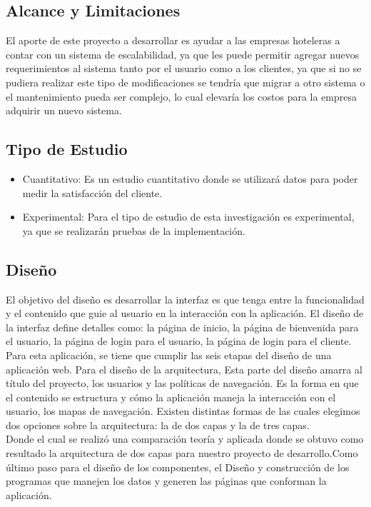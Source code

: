 \documentclass[12pt,a4paper,oneside]{article}
\begin{document}
\subsection{Alcance y Limitaciones}
El aporte de este proyecto a desarrollar es ayudar a las empresas hoteleras a contar con un sistema de escalabilidad, ya que les puede permitir agregar nuevos requerimientos al sistema tanto por el usuario como a los clientes, ya que si no se pudiera realizar este tipo de modificaciones se tendría que migrar a otro sistema o el mantenimiento pueda ser complejo, lo cual elevaría los costos para la empresa adquirir un nuevo sistema. 
\subsection{Tipo de Estudio}
\begin{itemize}
  \item Cuantitativo: Es un estudio cuantitativo donde se utilizará datos para poder medir la satisfacción del cliente.
  \item Experimental: Para el tipo de estudio de esta investigación es experimental, ya que se realizarán pruebas de la implementación.
  \end{itemize}
\subsection{Diseño}
El objetivo del diseño es desarrollar la interfaz es que tenga entre la funcionalidad y el contenido que guie al usuario en la interacción con la aplicación. El diseño de la interfaz define detalles como: la página de inicio, la página de bienvenida para el usuario, la página de login para el usuario, la página de login para el cliente. Para esta aplicación, se tiene que cumplir las seis etapas del diseño de una aplicación web.
Para el diseño de la arquitectura, Esta parte del diseño amarra al título del proyecto, los usuarios y las políticas de navegación. Es la forma en que el contenido se estructura y cómo la aplicación maneja la interacción con el usuario, los mapas de navegación. Existen distintas formas de las cuales elegimos dos opciones sobre la arquitectura: la de dos capas y la de tres capas.\\ Donde el cual se realizó una comparación teoría y aplicada donde se obtuvo como resultado la arquitectura de dos capas para nuestro proyecto de desarrollo.Como último paso para el diseño de los componentes, el Diseño y construcción de los programas que manejen los datos y generen las páginas que conforman la aplicación. 
\end{document}

